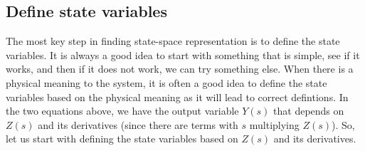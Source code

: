 \documentclass{ee122_notes}
\begin{document}
\subsection{Define state variables}
The most key step in finding state-space representation is to define the state variables. It is always a good idea to start with something that is simple, see if it works, and then if it does not work, we can try something else. When there is a physical meaning to the system, it is often a good idea to define the state variables based on the physical meaning as it will lead to correct defintions. In the two equations above, we have the output variable $Y(s)$ that depends on $Z(s)$ and its derivatives (since there are terms with $s$ multiplying $Z(s)$). So, let us start with defining the state variables based on $Z(s)$ and its derivatives. 
\end{document}
